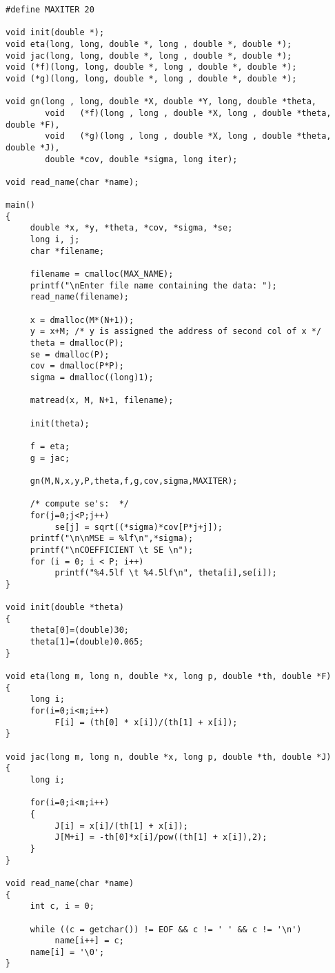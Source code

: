 \documentclass{article}
\begin{document}
{\begin{verbatim}
#define MAXITER 20

void init(double *);
void eta(long, long, double *, long , double *, double *);
void jac(long, long, double *, long , double *, double *);
void (*f)(long, long, double *, long , double *, double *);
void (*g)(long, long, double *, long , double *, double *);

void gn(long , long, double *X, double *Y, long, double *theta,
        void   (*f)(long , long , double *X, long , double *theta, double *F), 
        void   (*g)(long , long , double *X, long , double *theta, double *J),
        double *cov, double *sigma, long iter);

void read_name(char *name);

main()
{
     double *x, *y, *theta, *cov, *sigma, *se;
     long i, j;
     char *filename;
     
     filename = cmalloc(MAX_NAME);
     printf("\nEnter file name containing the data: ");
     read_name(filename);

     x = dmalloc(M*(N+1));
     y = x+M; /* y is assigned the address of second col of x */
     theta = dmalloc(P);
     se = dmalloc(P);
     cov = dmalloc(P*P);
     sigma = dmalloc((long)1);

     matread(x, M, N+1, filename); 

     init(theta);

     f = eta;
     g = jac;
     
     gn(M,N,x,y,P,theta,f,g,cov,sigma,MAXITER);

     /* compute se's:  */
     for(j=0;j<P;j++)
          se[j] = sqrt((*sigma)*cov[P*j+j]);        
     printf("\n\nMSE = %lf\n",*sigma);
     printf("\nCOEFFICIENT \t SE \n");
     for (i = 0; i < P; i++)
          printf("%4.5lf \t %4.5lf\n", theta[i],se[i]);
}

void init(double *theta)
{
     theta[0]=(double)30;
     theta[1]=(double)0.065;
}

void eta(long m, long n, double *x, long p, double *th, double *F)
{
     long i;
     for(i=0;i<m;i++)
          F[i] = (th[0] * x[i])/(th[1] + x[i]);
}

void jac(long m, long n, double *x, long p, double *th, double *J)
{
     long i;
  
     for(i=0;i<m;i++)
     {
          J[i] = x[i]/(th[1] + x[i]);
          J[M+i] = -th[0]*x[i]/pow((th[1] + x[i]),2);
     }
}

void read_name(char *name)
{
     int c, i = 0;
  
     while ((c = getchar()) != EOF && c != ' ' && c != '\n')
          name[i++] = c;
     name[i] = '\0';
}



\end{verbatim}}
\end{document}
